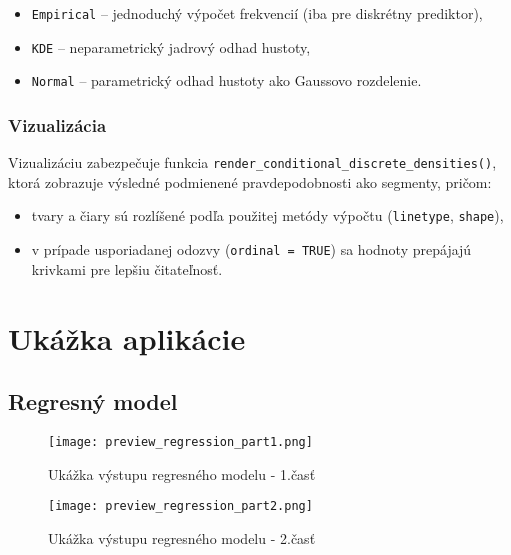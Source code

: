 \begin{itemize}
\setlength{\itemsep}{0pt}
  \setlength{\parskip}{0pt}
  \item \texttt{Empirical} – jednoduchý výpočet frekvencií (iba pre diskrétny prediktor),
  \item \texttt{KDE} – neparametrický jadrový odhad hustoty,
  \item \texttt{Normal} – parametrický odhad hustoty ako Gaussovo rozdelenie.
\end{itemize}

\subsubsection{Vizualizácia}

Vizualizáciu zabezpečuje funkcia \texttt{render\_conditional\_discrete\_densities()}, ktorá zobrazuje výsledné podmienené pravdepodobnosti ako segmenty, pričom:

\begin{itemize}
\setlength{\itemsep}{0pt}
  \setlength{\parskip}{0pt}
  \item tvary a čiary sú rozlíšené podľa použitej metódy výpočtu (\texttt{linetype}, \texttt{shape}),
  \item v prípade usporiadanej odozvy (\texttt{ordinal = TRUE}) sa hodnoty prepájajú krivkami pre lepšiu čitateľnosť.
\end{itemize}


\section{Ukážka aplikácie}\label{sec:app_preview}

\subsection{Regresný model}

\begin{figure}[H]
    \centering
    \texttt{[image: preview\_regression\_part1.png]}
    \caption{Ukážka výstupu regresného modelu - 1.časť}
    \label{fig:preview_regression_part1}
\end{figure}

\begin{figure}[H]
    \centering
    \texttt{[image: preview\_regression\_part2.png]}
    \caption{Ukážka výstupu regresného modelu - 2.časť}
    \label{fig:preview_regression_part2}
\end{figure}

